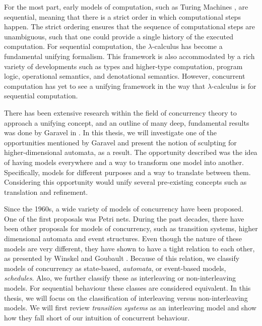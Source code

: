     For the most part, early models of computation, such as Turing Machines \cite{turing_1937}, are sequential, meaning that there is a strict order in which computational steps happen. The strict ordering ensures that the sequence of computational steps are unambiguous, such that one could provide a single history of the executed computation. For sequential computation, the $\lambda$-calculus has become a fundamental unifying formalism. This framework is also accommodated by a rich variety of developments such as types and higher-type computation, program logic, operational semantics, and denotational semantics. However, concurrent computation has yet to see a unifying framework in the way that $\lambda$-calculus is for sequential computation.
    
    There has been extensive research within the field of concurrency theory to approach a unifying concept, and an outline of many deep, fundamental results was done by Garavel in \cite{gravel08summary}. In this thesis, we will investigate one of the opportunities mentioned by Garavel and present the notion of sculpting for higher-dimensional automata, as a result. The opportunity described was the idea of having models everywhere and a way to transform one model into another. Specifically, models for different purposes and a way to translate between them. Considering this opportunity would unify several pre-existing concepts such as translation and refinement.

    Since the 1960s, a wide variety of models of concurrency have been proposed. One of the first proposals was Petri nets. During the past decades, there have been other proposals for models of concurrency, such as transition systems, higher dimensional automata and event structures. Even though the nature of these models are very different, they have shown to have a tight relation to each other, as presented by Winskel \cite{winskel95modelsCategory} and Goubault \cite{Goubault18RelationshipsModelsForConcurrency}. Because of this relation, we classify models of concurrency as state-based, \emph{automata}, or event-based models, \emph{schedules}. Also, we further classify these as interleaving or non-interleaving models. For sequential behaviour these classes are considered equivalent. In this thesis, we will  focus on the classification of interleaving versus non-interleaving models. We will first review \emph{transition systems} as an interleaving model and show how they fall short of our intuition of concurrent behaviour.